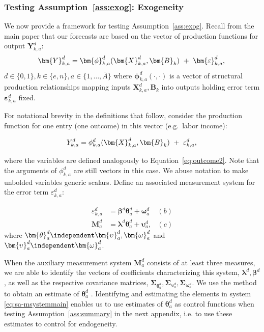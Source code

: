 \subsubsection{Testing Assumption~\ref{ass:exog}: Exogeneity} \label{app:endogeneity}

\noindent We now provide a framework for testing Assumption~\ref{ass:exog}. Recall from the main paper that our forecasts are based on the vector of production functions for output $\bm{Y}^d_{k,a}$:
\begin{equation}
\bm{Y}^d_{k,a} = \bm{\phi}^d_{k,a} (\bm{X}^d_{k,a}, \bm{B}_k) \ + \ \bm{\varepsilon}^d_{k,a},  \label{eq:outcome2} \\
\end{equation}
$d \in\{0,1\},  k\in\{e,n\}, a\in\{1,\dots,\bar{A}\}$ where $\bm{\phi}^d_{k,a}\left( \cdot, \cdot \right)$ is a vector of structural production relationships mapping inputs $\bm{X}^d_{k,a}, \bm{B}_k$ into outputs holding error term $\bm{\varepsilon}^d_{k,a}$ fixed.

For notational brevity in the definitions that follow, consider the production function for one entry (one outcome) in this vector (e.g.\ labor income):

\begin{equation}
Y^d_{k,a} =\phi^d_{k,a} (\bm{X}^d_{k,a}, \bm{B}_k) \ + \ \varepsilon^d_{k,a},  \label{eq:outcomesin} \\
\end{equation}

\noindent where the variables are defined analogously to Equation~\eqref{eq:outcome2}. Note that the arguments of $\phi^d_{k,a}$ are still vectors in this case. We abuse notation to make unbolded variables generic scalars. Define an associated measurement system for the error term $\varepsilon^d_{k,a}$:

\begin{align}  \label{eq:sa-msystemmain}
\varepsilon^d_{k,a} &=\bm{\beta}^d \bm{\theta}_{a}^d + \bm{\omega}_{a}^d  &(b) \nonumber \\
\bm{M}_{a}^d &= \bm{\lambda}^d \bm{\theta}_{a}^d + \bm{\upsilon}_a^d,  &(c)
\end{align}
where $\bm{\theta}^d_a \independent \bm{\upsilon}_{a}^d, \bm{\omega}_{a}^d$ and $\bm{\upsilon}_{a}^d \independent \bm{\omega}_{a}^d$.

\noindent When the auxiliary measurement system $\bm{M}_{a}^d $ consists of at least three measures, we are able to identify the vectors of coefficients characterizing this system, $\bm{\lambda}^d, \bm{\beta}^d$, as well as the respective covariance matrices, $\bm{\Sigma}_{\bm{\theta}_{a}^d}, \bm{\Sigma}_{\bm{\upsilon}_{a}^d}, \bm{\Sigma}_{\bm{\omega}_{a}^d}$. We use the \citet{Bartlett_1938_Nature} method to obtain an estimate of $\bm{\theta}_{a}^d$ \citep{Heckman_Pinto_etal_2013_PerryFactor}. Identifying and estimating the elements in system \eqref{eq:sa-msystemmain} enables us to use estimates of $\bm{\theta}_{a}^d$ as control functions when testing Assumption~\ref{ass:summary} in the next appendix, i.e. to use these estimates to control for endogeneity.

